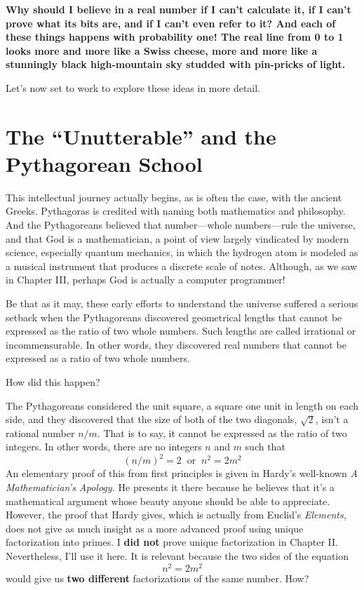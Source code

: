 \documentclass[12pt]{book}
\begin{document}
\textbf{
Why should I believe in a real number if I can't calculate it, if I can't prove
what its bits are, and if I can't even refer to it? 
And each of these things happens with probability one!
The real line from 0 to 1 looks more and more like a Swiss cheese, 
more and more
like a stunningly black high-mountain
sky studded with pin-pricks of light.
}
 
Let's now set to work to explore these ideas in more detail.

\section*{The ``Unutterable'' and the Pythagorean School}

This intellectual journey actually begins, as is often the case, with the ancient Greeks. 
Pythagoras is credited with naming both mathematics and philosophy.
And the Pythagoreans believed that number---whole numbers---rule the universe, 
and that God is a mathematician,
a point of view largely vindicated by modern science, especially quantum mechanics,  
in which the hydrogen atom is modeled as a musical instrument that produces a discrete scale of notes.
Although, as we saw in Chapter III, perhaps God is actually a computer programmer!
 
Be that as it may, these early efforts to understand the universe suffered
a serious setback when the 
Pythagoreans discovered geometrical lengths that cannot be expressed as the
ratio of two whole numbers. Such lengths are called irrational or incommensurable.
In other words, they discovered real numbers that cannot be expressed as a ratio of 
two whole numbers.
 
How did this happen?
 
The Pythagoreans considered the unit square, 
a square one unit in length on each side, and they discovered that
the size of both of the two diagonals, $\sqrt{2}$,
isn't a rational number $n/m$. That is to say, it cannot
be expressed as the ratio of two integers. 
In other words, there are no integers $n$ and $m$ such that
\[
   (n/m)^2 = 2 \;\; \mbox{or} \;\; n^2 = 2 m^2
\] 
An elementary proof of this from first principles is given in Hardy's 
well-known
\emph{A Mathematician's
Apology.} 
He presents it there because
he believes that it's
a mathematical argument whose beauty anyone should be able to appreciate.
However, the proof that Hardy gives, which is actually from Euclid's \emph{Elements,} 
does not give as much insight as a more advanced proof using
unique factorization into primes. I \textbf{did not} prove unique factorization in Chapter II.
Nevertheless, I'll use it here.
It is relevant because the two sides of the equation 
\[
   n^{2} = 2 m^{2}
\] 
would give us \textbf{two different}
factorizations of the same number. How?
 
\end{document}
